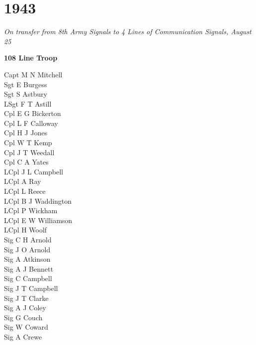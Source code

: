 \chapter*{1943}

\vspace*{10mm}

\begin{center}
  \textit{On transfer from 8th Army Signals to 4 Lines of Communication Signals, August 25}
\end{center}

\vspace*{5mm}

\begin{center}
  \Large
  \textbf{108 Line Troop}
\end{center}

\begin{multicols}{3}
  \footnotesize
  \noindent
  Capt M N Mitchell \\
  Sgt E Burgess \\
  Sgt S Astbury \\
  LSgt F T Astill \\
  Cpl E G Bickerton \\
  Cpl L F Calloway \\
  Cpl H J Jones \\
  Cpl W T Kemp \\
  Cpl J T Weedall \\
  Cpl C A Yates \\
  LCpl J L Campbell \\
  LCpl A Ray \\
  LCpl L Reece \\
  LCpl B J Waddington \\
  LCpl P Wickham \\
  LCpl E W Williamson \\
  LCpl H Woolf \\
  Sig C H Arnold \\
  Sig J O Arnold \\
  Sig A Atkinson \\
  Sig A J Bennett \\
  Sig C Campbell \\
  Sig J T Campbell \\
  Sig J T Clarke \\
  Sig A J Coley \\
  Sig G Couch \\
  Sig W Coward \\
  Sig A Crewe \\

\end{multicols}
